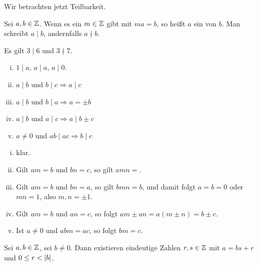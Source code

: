 	Wir betrachten jetzt Teilbarkeit.
	
	\begin{definition}[Teiler]
		\label{def:teiler}
		Sei $a,b \in \mathbb{Z}$.
		Wenn es ein $m \in \mathbb{Z}$ gibt mit $ma = b$, so heißt $a$ ein  von $b$. \marginnote{[4]}
		Man schreibt $a \mid b$, andernfalls $a \nmid b$. 
	\end{definition}

	\begin{beispiel}
		Es gilt $3 \mid 6$ und $3 \nmid 7$.
	\end{beispiel}

	\begin{satz}
		\label{satz:rechenregeln}
		\begin{enumerate}[(i)]
			\item $1 \mid a$, $a \mid a$, $a \mid 0$.
			\item $a \mid b$ und $b \mid c \Rightarrow a \mid c$
			\item $a \mid b$ und $b \mid a \Rightarrow a = \pm b$
			\item $a \mid b$ und $a \mid c \Rightarrow a \mid b \pm c$
			\item $a \neq 0$ und $ab \mid ac \Rightarrow b \mid c$
		\end{enumerate}
	\end{satz}

	\begin{beweis}
		\begin{enumerate}[(i)]
			\item klar.
			\item Gilt $am = b$ und $bn = c$, so gilt $amn = $.
			\item Gilt $am = b$ und $bn = a$, so gilt $bmn = b$, und damit folgt $a = b = 0$ oder $mn = 1$, also $m,n = \pm 1$.
			\item Gilt $am = b$ und $an = c$, so folgt $am \pm an = a(m \pm n) = b \pm c$.
			\item Ist $a \neq 0$ und $abm = ac$, so folgt $bm = c$.
		\end{enumerate}
	\end{beweis}

	\begin{satz}
		\label{satz:teilen mit rest}
		Sei $a,b \in \mathbb{Z}$, sei $b \neq 0$.  \marginnote{[5]}
		Dann existieren eindeutige Zahlen $r,s \in \mathbb{Z}$ mit $a = bs + r$ und $0 \leq r < \left\lvert b\right\rvert$.
	\end{satz}

